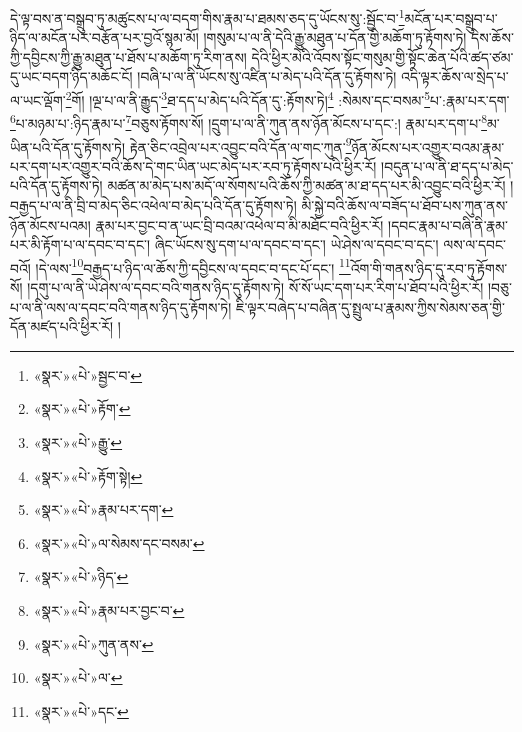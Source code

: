 དེ་ལྟ་བས་ན་བསྒྲུབ་ཏུ་མཚུངས་པ་ལ་བདག་གིས་རྣམ་པ་ཐམས་ཅད་དུ་ཡོངས་སུ་:སྦྱོང་བ་\footnote{«སྣར་»«པེ་»སྦྱང་བ་}མངོན་པར་བསྒྲུབ་པ་ཉིད་ལ་མངོན་པར་བརྩོན་པར་བྱའོ་སྙམ་མོ། །གསུམ་པ་ལ་ནི་དེའི་རྒྱུ་མཐུན་པ་དོན་གྱི་མཆོག་ཏུ་རྟོགས་ཏེ། དེས་ཆོས་ཀྱི་དབྱིངས་ཀྱི་རྒྱུ་མཐུན་པ་ཐོས་པ་མཆོག་ཏུ་རིག་ནས། དེའི་ཕྱིར་མེའི་འོབས་སྟོང་གསུམ་གྱི་སྟོང་ཆེན་པོའི་ཚད་ཙམ་དུ་ཡང་བདག་ཉིད་མཆོང་ངོ། །བཞི་པ་ལ་ནི་ཡོངས་སུ་འཛིན་པ་མེད་པའི་དོན་དུ་རྟོགས་ཏེ། འདི་ལྟར་ཆོས་ལ་སྲེད་པ་ལ་ཡང་ལྡོག་\footnote{«སྣར་»«པེ་»རྟོག་}གོ། །ལྔ་པ་ལ་ནི་རྒྱུད་\footnote{«སྣར་»«པེ་»རྒྱུ་}ཐ་དད་པ་མེད་པའི་དོན་དུ་:རྟོགས་ཏེ།\footnote{«སྣར་»«པེ་»རྟོག་སྟེ།} :སེམས་དང་བསམ་\footnote{«སྣར་»«པེ་»རྣམ་པར་དག་}པ་:རྣམ་པར་དག་\footnote{«སྣར་»«པེ་»ལ་སེམས་དང་བསམ་}པ་མཉམ་པ་:ཉིད་རྣམ་པ་\footnote{«སྣར་»«པེ་»ཉིད་}བཅུས་རྟོགས་སོ། །དྲུག་པ་ལ་ནི་ཀུན་ནས་ཉོན་མོངས་པ་དང་:། རྣམ་པར་དག་པ་\footnote{«སྣར་»«པེ་»རྣམ་པར་བྱང་བ་}མ་ཡིན་པའི་དོན་དུ་རྟོགས་ཏེ། རྟེན་ཅིང་འབྲེལ་པར་འབྱུང་བའི་དོན་ལ་གང་ཀུན་\footnote{«སྣར་»«པེ་»ཀུན་ནས་}ཉོན་མོངས་པར་འགྱུར་བའམ་རྣམ་པར་དག་པར་འགྱུར་བའི་ཆོས་དེ་གང་ཡིན་ཡང་མེད་པར་རབ་ཏུ་རྟོགས་པའི་ཕྱིར་རོ། །བདུན་པ་ལ་ནི་ཐ་དད་པ་མེད་པའི་དོན་དུ་རྟོགས་ཏེ། མཚན་མ་མེད་པས་མདོ་ལ་སོགས་པའི་ཆོས་ཀྱི་མཚན་མ་ཐ་དད་པར་མི་འབྱུང་བའི་ཕྱིར་རོ། །བརྒྱད་པ་ལ་ནི་བྲི་བ་མེད་ཅིང་འཕེལ་བ་མེད་པའི་དོན་དུ་རྟོགས་ཏེ། མི་སྐྱེ་བའི་ཆོས་ལ་བཟོད་པ་ཐོབ་པས་ཀུན་ནས་ཉོན་མོངས་པའམ། རྣམ་པར་བྱང་བ་ན་ཡང་བྲི་བའམ་འཕེལ་བ་མི་མཐོང་བའི་ཕྱིར་རོ། །དབང་རྣམ་པ་བཞི་ནི་རྣམ་པར་མི་རྟོག་པ་ལ་དབང་བ་དང་། ཞིང་ཡོངས་སུ་དག་པ་ལ་དབང་བ་དང་། ཡེ་ཤེས་ལ་དབང་བ་དང་། ལས་ལ་དབང་བའོ། །དེ་ལས་\footnote{«སྣར་»«པེ་»ལ་}བརྒྱད་པ་ཉིད་ལ་ཆོས་ཀྱི་དབྱིངས་ལ་དབང་བ་དང་པོ་དང་། \footnote{«སྣར་»«པེ་»དང་}འོག་གི་གནས་ཉིད་དུ་རབ་ཏུ་རྟོགས་སོ། །དགུ་པ་ལ་ནི་ཡེ་ཤེས་ལ་དབང་བའི་གནས་ཉིད་དུ་རྟོགས་ཏེ། སོ་སོ་ཡང་དག་པར་རིག་པ་ཐོབ་པའི་ཕྱིར་རོ། །བཅུ་པ་ལ་ནི་ལས་ལ་དབང་བའི་གནས་ཉིད་དུ་རྟོགས་ཏེ། ཇི་ལྟར་བཞེད་པ་བཞིན་དུ་སྤྲུལ་པ་རྣམས་ཀྱིས་སེམས་ཅན་གྱི་དོན་མཛད་པའི་ཕྱིར་རོ། །
